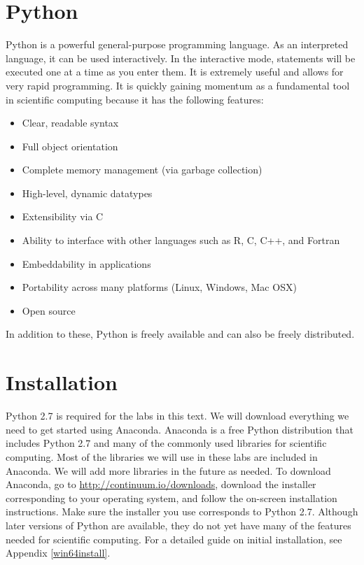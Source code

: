 \label{lab:Essential_Python}

\section*{Python}
Python is a powerful general-purpose programming language. As an interpreted
language, it can be used interactively.
In the interactive mode, statements will be executed one at a time as you enter them.
It is extremely useful and allows for very rapid programming.
It is quickly gaining momentum as a fundamental tool in scientific computing because it has the following features:
\begin{itemize}
\item Clear, readable syntax
\item Full object orientation
\item Complete memory management (via garbage collection)
\item High-level, dynamic datatypes
\item Extensibility via C
\item Ability to interface with other languages such as R, C, C++, and Fortran
\item Embeddability in applications
\item Portability across many platforms (Linux, Windows, Mac OSX)
\item Open source
\end{itemize}
In addition to these, Python is freely available and can also be freely distributed.

\section*{Installation}
Python 2.7 is required for the labs in this text. We will download everything we need to get started using Anaconda. Anaconda is a free Python distribution that includes Python 2.7 and many of the commonly used libraries for scientific computing. Most of the libraries we will use in these labs are included in Anaconda. We will add more libraries in the future as needed. To download Anaconda, go to \url{http://continuum.io/downloads}, download the installer corresponding to your operating system, and follow the on-screen installation instructions. Make sure the installer you use corresponds to Python 2.7. Although later versions of Python are available, they do not yet have many of the features needed for scientific computing. For a detailed guide on initial installation, see Appendix \ref{win64install}. 


